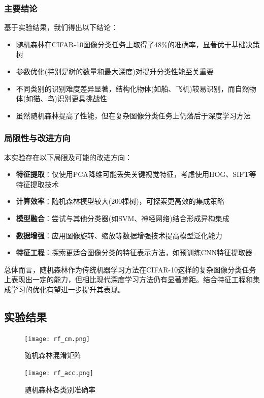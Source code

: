 \documentclass[UTF8]{report}
\theoremstyle{MyLineTheoremStyle} %
\theoremstyle{MyBlockTheoremStyle} %
\theoremstyle{MySubsubsectionStyle} %
\begin{document}
\subsubsection{主要结论}
基于实验结果，我们得出以下结论：
\begin{itemize}
    \item 随机森林在CIFAR-10图像分类任务上取得了48\%的准确率，显著优于基础决策树
    \item 参数优化(特别是树的数量和最大深度)对提升分类性能至关重要
    \item 不同类别的识别难度差异显著，结构化物体(如船、飞机)较易识别，而自然物体(如猫、鸟)识别更具挑战性
    \item 虽然随机森林提高了性能，但在复杂图像分类任务上仍落后于深度学习方法
\end{itemize}

\subsubsection{局限性与改进方向}
本实验存在以下局限及可能的改进方向：
\begin{itemize}
    \item \textbf{特征提取}：仅使用PCA降维可能丢失关键视觉特征，考虑使用HOG、SIFT等特征提取技术
    \item \textbf{计算效率}：随机森林模型较大(200棵树)，可探索更高效的集成策略
    \item \textbf{模型融合}：尝试与其他分类器(如SVM、神经网络)结合形成异构集成
    \item \textbf{数据增强}：应用图像旋转、缩放等数据增强技术提高模型泛化能力
    \item \textbf{特征工程}：探索更适合图像分类的特征表示方法，如预训练CNN特征提取器
\end{itemize}

总体而言，随机森林作为传统机器学习方法在CIFAR-10这样的复杂图像分类任务上表现出一定的能力，但相比现代深度学习方法仍有显著差距。结合特征工程和集成学习的优化有望进一步提升其表现。

\subsection{实验结果}

\begin{figure}[H]
    \centering
    \texttt{[image: rf\_cm.png]}
    \caption{随机森林混淆矩阵}
    \label{fig:rf_confusion_matrix}
\end{figure}

\begin{figure}[H]
    \centering
    \texttt{[image: rf\_acc.png]}
    \caption{随机森林各类别准确率}
    \label{fig:rf_class_accuracy}
\end{figure}
\end{document}
